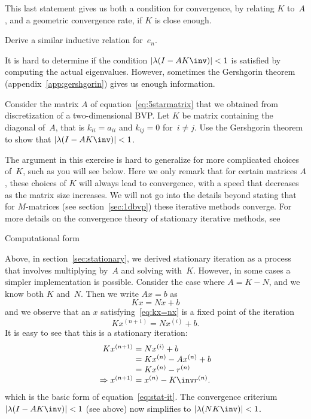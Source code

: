 This last statement gives us both a condition for convergence, by
relating $K$ to~$A$, and a geometric convergence rate, if $K$ is
close enough.

\begin{exercise}
  Derive a similar inductive relation for~$e_n$. 
\end{exercise}

It is hard to determine if the condition $|\lambda(I-AK\inv)|<1$ is
satisfied by computing the actual eigenvalues. However, sometimes the
Gershgorin theorem (appendix~\ref{app:gershgorin}) gives us enough
information.

\begin{exercise}
  Consider the matrix $A$ of equation~\eqref{eq:5starmatrix} that we
  obtained from discretization of a two-dimensional \ac{BVP}. Let $K$
  be matrix containing the diagonal of~$A$, that is $k_{ii}=a_{ii}$
  and $k_{ij}=0$ for~$i\not=j$. Use the Gershgorin theorem to show
  that $|\lambda(I-AK\inv)|<1$.
\end{exercise}

The argument in this exercise is hard to generalize for more
complicated choices of~$K$, such as you will see below.
Here we only remark that for certain matrices $A$, these choices of
$K$ will always lead to convergence, with a speed that decreases as
the matrix size increases. We will not go into the details beyond
stating that for $M$-matrices (see section~\ref{sec:1dbvp}) these
iterative methods converge. For more details on the convergence theory
of stationary iterative methods, see~\cite{Varga:iterative-analysis}

 {Computational form}
\label{sec:jacobi-seidel}

Above, in section~\ref{sec:stationary}, we derived stationary
iteration as a process that involves multiplying by~$A$ and solving
with~$K$. However, in some cases a simpler implementation is
possible. Consider the case where $A=K-N$, and we know both $K$
and~$N$. Then we write $Ax=b$ as
\begin{equation}
  Kx=Nx+b
  \label{eq:kx=nx}
\end{equation}
and we observe that an $x$ satisfying~\eqref{eq:kx=nx}
is a fixed point of the iteration
\[ Kx^{(n+1)}=Nx^{(i)}+b. \]
It is easy to see that this is a stationary iteration:
\[
\begin{array}{r@{{}={}}l}
  Kx^{(n+1)}&Nx^{(i)}+b\\ &Kx^{(n)}-Ax^{(n)}+b\\ &Kx^{(n)}-r^{(n)}\\
  \Rightarrow x^{(n+1)} & x^{(n)}-K\inv r^{(n)}.
\end{array}
\]
which is the basic form of equation~\eqref{eq:stat-it}.
%
The convergence criterium $|\lambda(I-AK\inv)|<1$ (see
above) now simplifies to
$|\lambda(NK\inv)|<\nobreak1$.

